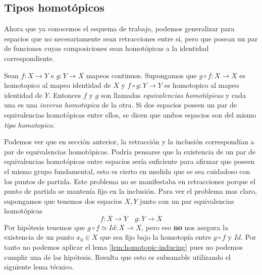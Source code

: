 \subsection{Tipos homotópicos}
Ahora que ya conocemos el esquema de trabajo, podemos generalizar para
espacios que no necesariamente sean retracciones entre si, pero que
posean un par de funciones cuyas composiciones sean homotópicas a la
identidad correspondiente.
\begin{definicion} \label{def:equivalencias-hom}
  Sean \(f : X \to Y\) e \(g : Y \to X\) mapeos continuos. Supongamos
  que \( g \circ f : X \to X \) es homotopico al mapeo identidad de
  \(X\) y \( f \circ g : Y \to Y \) es homotopico al mapeo identidad de
  \(Y\). Entonces \(f\) y \(g\) son llamadas \emph{equivalencias
  homotópicas} y cada una es una \emph{inversa homotopica} de la otra.
  Si dos espacios poseen un par de equivalencias homotópicas entre ellos,
  se dicen que ambos espacios son del mismo \emph{tipo homotopico}.
\end{definicion}
Podemos ver que en sección anterior, la retracción y la inclusión
correspondían a par de equivalencias homotópicas. Podría pensarse que la
existencia de un par de equivalencias homotópicas entre espacios sería
suficiente para afirmar que poseen el mismo grupo fundamental, esto es
cierto en medida que se sea cuidadoso con los puntos de partida. Este
problema no se manifestaba en retracciones porque el punto de partida se
mantenía fijo en la inclusión. Para ver el problema mas claro,
supongamos que tenemos dos espacios \(X, Y\) junto con un par
equivalencias homotópicas
\[ f : X \to Y \quad g : Y \to X \]
Por hipótesis tenemos que \(g \circ f \simeq Id : X \to X\), pero eso
\textbf{no} nos asegura la existencia de un punto \(x_0 \in X\) que sea
fijo bajo la homotopía entre \( g \circ f\) y \(Id\). Por tanto no
podemos aplicar el lema \ref{lem:homotopic-inducing} pues no podemos
cumplir una de las hipótesis. Resulta que esto es subsanable utilizando
el siguiente lema técnico.

